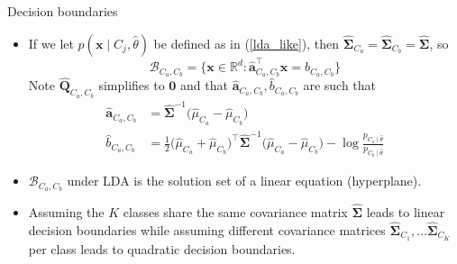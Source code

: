 \documentclass{beamer}
\numberwithin{equation}{section}
\newcommand{\aref}[1]{\alert{\ref{#1}}}
\begin{document}
\begin{frame}{Decision boundaries}
    \begin{itemize}
        \item
        If we let $ p(\mathbf{x} \mid C_j, \hat{\theta}) $ be defined as in
        (\aref{lda_like}), then $ \hat{\mathbf{\Sigma}}_{C_a} =
        \hat{\mathbf{\Sigma}}_{C_b} = \hat{\mathbf{\Sigma}} $, so
        \begin{equation} \label{lda_decision_boundary}
            \mathcal{B}_{C_a, C_b} = \big\{
                \mathbf{x} \in \mathbb{R}^d :
                    \hat{\mathbf{a}}_{C_a, C_b}^\top\mathbf{x} =
                    \hat{b}_{C_a, C_b}
            \big\}
        \end{equation}
        Note $ \hat{\mathbf{Q}}_{C_a, C_b} $ simplifies to $ \mathbf{0} $ and
        that $ \hat{\mathbf{a}}_{C_a, C_b}, \hat{b}_{C_a, C_b} $ are such that
        \begin{equation*}
            \begin{split}
            \hat{\mathbf{a}}_{C_a, C_b} & = \hat{\mathbf{\Sigma}}^{-1}
                \big(\hat{\mu}_{C_a} - \hat{\mu}_{C_b}\big) \\
            \hat{b}_{C_a, C_b} & = \frac{1}{2}
                \big(\hat{\mu}_{C_a} + \hat{\mu}_{C_b}\big)^\top
                \hat{\mathbf{\Sigma}}^{-1}
                \big(\hat{\mu}_{C_a} - \hat{\mu}_{C_b}\big)
            - \log\frac{
                p_{C_a \mid \hat{\theta}}
            }{p_{C_b \mid \hat{\theta}}}
            \end{split}
        \end{equation*}

        \item
        $ \mathcal{B}_{C_a, C_b} $ under LDA is the solution set of a linear
        equation (hyperplane).

        \item
        Assuming the $ K $ classes share the same covariance matrix
        $ \hat{\mathbf{\Sigma}} $ leads to \alert{linear} decision boundaries
        while assuming different covariance matrices
        $ \hat{\mathbf{\Sigma}}_{C_1}, \ldots \hat{\mathbf{\Sigma}}_{C_K} $
        per class leads to \alert{quadratic} decision boundaries.
    \end{itemize}
\end{frame}
\end{document}
